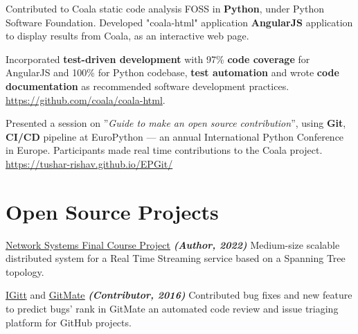 \documentclass[]{deedy-resume-openfont}
\begin{document}
\begin{minipage}[t]{0.66\textwidth}
\begin{tightemize}     
\item Contributed to Coala \textemdash static code analysis FOSS \textemdash in \textbf{Python}, under Python Software Foundation. Developed "coala-html" application \textemdash \textbf{AngularJS} application to display results from Coala, as an interactive web page.
\item Incorporated \textbf{test-driven development} with 97\%    \textbf{code coverage} for AngularJS and 100\% for Python codebase, \textbf{test automation} and wrote \textbf{code documentation} as recommended software development practices. \href{https://github.com/coala/coala-html}{https://github.com/coala/coala-html}.
\end{tightemize}
\sectionsep

\begin{tightemize}
\item Presented a session on ”\textit{Guide to make an open source contribution}”, using \textbf{Git}, \textbf{CI/CD} pipeline at EuroPython — an annual International Python Conference in Europe. Participants made real time contributions to the Coala project. \href{https://tushar-rishav.github.io/EPGit/}{https://tushar-rishav.github.io/EPGit/}
\end{tightemize}
\sectionsep

\section{Open Source Projects}
\vspace{\topsep}
\begin{tightemize}
    \item \href{https://github.com/tushar-rishav/CSCI5273_Final_Project}{\underline {Network Systems Final Course Project}} {\footnotesize \textit{\textbf{(Author, 2022) }}} Medium-size scalable distributed system for a Real Time Streaming service based on a Spanning Tree topology.
    \item \href{https://gitlab.com/gitmate/open-source/IGitt}{\underline {IGitt}} and \href{https://gitlab.com/gitmate/open-source/gitmate-2}{\underline {GitMate}} {\footnotesize \textit{\textbf{(Contributor, 2016) }}} \textemdash Contributed bug fixes and new feature to predict bugs' rank in GitMate \textemdash an automated code review and issue triaging platform for GitHub projects. \\

\end{tightemize}
\sectionsep

\end{minipage} 
\end{document}

